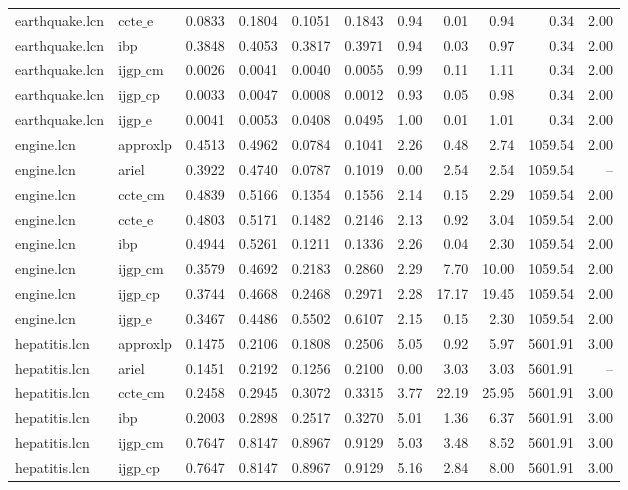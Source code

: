 \begin{table}[ht]
\begin{tabular}{llrrrrrrrrr}
earthquake.lcn & $\text{ccte\_e}$ & 0.0833 & 0.1804 & 0.1051 & 0.1843 & 0.94 & 0.01 & 0.94 & 0.34 & 2.00 \\
earthquake.lcn & ibp & 0.3848 & 0.4053 & 0.3817 & 0.3971 & 0.94 & 0.03 & 0.97 & 0.34 & 2.00 \\
earthquake.lcn & $\text{ijgp\_cm}$ & 0.0026 & 0.0041 & 0.0040 & 0.0055 & 0.99 & 0.11 & 1.11 & 0.34 & 2.00 \\
earthquake.lcn & $\text{ijgp\_cp}$ & 0.0033 & 0.0047 & 0.0008 & 0.0012 & 0.93 & 0.05 & 0.98 & 0.34 & 2.00 \\
earthquake.lcn & $\text{ijgp\_e}$ & 0.0041 & 0.0053 & 0.0408 & 0.0495 & 1.00 & 0.01 & 1.01 & 0.34 & 2.00 \\
engine.lcn & approxlp & 0.4513 & 0.4962 & 0.0784 & 0.1041 & 2.26 & 0.48 & 2.74 & 1059.54 & 2.00 \\
engine.lcn & ariel & 0.3922 & 0.4740 & 0.0787 & 0.1019 & 0.00 & 2.54 & 2.54 & 1059.54 & -- \\
engine.lcn & $\text{ccte\_cm}$ & 0.4839 & 0.5166 & 0.1354 & 0.1556 & 2.14 & 0.15 & 2.29 & 1059.54 & 2.00 \\
engine.lcn & $\text{ccte\_e}$ & 0.4803 & 0.5171 & 0.1482 & 0.2146 & 2.13 & 0.92 & 3.04 & 1059.54 & 2.00 \\
engine.lcn & ibp & 0.4944 & 0.5261 & 0.1211 & 0.1336 & 2.26 & 0.04 & 2.30 & 1059.54 & 2.00 \\
engine.lcn & $\text{ijgp\_cm}$ & 0.3579 & 0.4692 & 0.2183 & 0.2860 & 2.29 & 7.70 & 10.00 & 1059.54 & 2.00 \\
engine.lcn & $\text{ijgp\_cp}$ & 0.3744 & 0.4668 & 0.2468 & 0.2971 & 2.28 & 17.17 & 19.45 & 1059.54 & 2.00 \\
engine.lcn & $\text{ijgp\_e}$ & 0.3467 & 0.4486 & 0.5502 & 0.6107 & 2.15 & 0.15 & 2.30 & 1059.54 & 2.00 \\
hepatitis.lcn & approxlp & 0.1475 & 0.2106 & 0.1808 & 0.2506 & 5.05 & 0.92 & 5.97 & 5601.91 & 3.00 \\
hepatitis.lcn & ariel & 0.1451 & 0.2192 & 0.1256 & 0.2100 & 0.00 & 3.03 & 3.03 & 5601.91 & -- \\
hepatitis.lcn & $\text{ccte\_cm}$ & 0.2458 & 0.2945 & 0.3072 & 0.3315 & 3.77 & 22.19 & 25.95 & 5601.91 & 3.00 \\
hepatitis.lcn & ibp & 0.2003 & 0.2898 & 0.2517 & 0.3270 & 5.01 & 1.36 & 6.37 & 5601.91 & 3.00 \\
hepatitis.lcn & $\text{ijgp\_cm}$ & 0.7647 & 0.8147 & 0.8967 & 0.9129 & 5.03 & 3.48 & 8.52 & 5601.91 & 3.00 \\
hepatitis.lcn & $\text{ijgp\_cp}$ & 0.7647 & 0.8147 & 0.8967 & 0.9129 & 5.16 & 2.84 & 8.00 & 5601.91 & 3.00 \\

\end{tabular}
\end{table}
